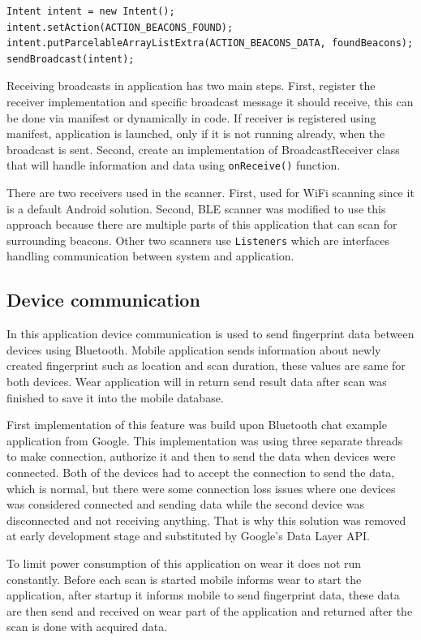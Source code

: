 \begin{lstlisting}[caption=Send broadcast with BLE beacons found.]
Intent intent = new Intent();
intent.setAction(ACTION_BEACONS_FOUND);
intent.putParcelableArrayListExtra(ACTION_BEACONS_DATA, foundBeacons);
sendBroadcast(intent);
\end{lstlisting}

Receiving broadcasts in application has two main steps. First, register the receiver implementation and specific broadcast message it should receive, this can be done via manifest or dynamically in code. If receiver is registered using manifest, application is launched, only if it is not running already, when the broadcast is sent. Second, create an implementation of BroadcastReceiver class that will handle information and data using \verb|onReceive()| function.

There are two receivers used in the scanner. First, used for WiFi scanning since it is a default Android solution. Second, BLE scanner was modified to use this approach because there are multiple parts of this application that can scan for surrounding beacons. Other two scanners use \verb|Listeners| which are interfaces handling communication between system and application.

\subsection{Device communication}\label{subsec:DeviceCommunication}
In this application device communication is used to send fingerprint data between devices using Bluetooth. Mobile application sends information about newly created fingerprint such as location and scan duration, these values are same for both devices. Wear application will in return send result data after scan was finished to save it into the mobile database.

First implementation of this feature was build upon Bluetooth chat example application from Google. This implementation was using three separate threads to make connection, authorize it and then to send the data when devices were connected. Both of the devices had to accept the connection to send the data, which is normal, but there were some connection loss issues where one devices was considered connected and sending data while the second device was disconnected and not receiving anything. That is why this solution was removed at early development stage and substituted by Google's Data Layer API.

To limit power consumption of this application on wear it does not run constantly. Before each scan is started mobile informs wear to start the application, after startup it informs mobile to send fingerprint data, these data are then send and received on wear part of the application and returned after the scan is done with acquired data.

